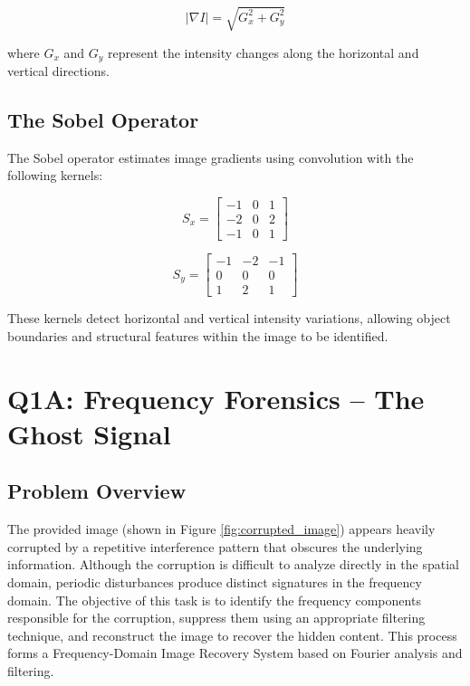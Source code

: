\documentclass[10pt, a4paper, twocolumn]{article}
\begin{document}
\begin{equation}
|\nabla I|=\sqrt{G_x^2+G_y^2}
\end{equation}

where $G_x$ and $G_y$ represent the intensity changes along the horizontal and vertical directions.

\subsection{The Sobel Operator}

The Sobel operator estimates image gradients using convolution with the following kernels:

\begin{equation}
S_x = 
\begin{bmatrix}
-1 & 0 & 1 \\
-2 & 0 & 2 \\
-1 & 0 & 1
\end{bmatrix}
\end{equation}

\begin{equation}
S_y=
\begin{bmatrix}
-1 & -2 & -1\\
0 & 0 & 0\\
1 & 2 & 1
\end{bmatrix}
\end{equation}

These kernels detect horizontal and vertical intensity variations, allowing object boundaries and structural features within the image to be identified.

\section{Q1A: Frequency Forensics – The Ghost Signal}

\subsection{Problem Overview}

The provided image (shown in Figure \ref{fig:corrupted_image}) appears heavily corrupted by a repetitive interference pattern that obscures the underlying information. Although the corruption is difficult to analyze directly in the spatial domain, periodic disturbances produce distinct signatures in the frequency domain. The objective of this task is to identify the frequency components responsible for the corruption, suppress them using an appropriate filtering technique, and reconstruct the image to recover the hidden content. This process forms a Frequency-Domain Image Recovery System based on Fourier analysis and filtering.
\end{document}

